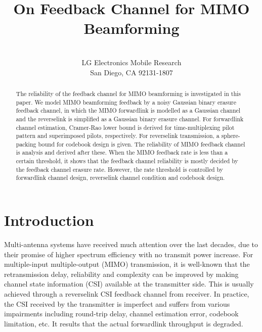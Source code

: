 \documentclass[10pt,fleqn, twocolumn]{IEEEtran}
\title{On Feedback Channel for MIMO Beamforming}
\author{\\LG Electronics Mobile Research\\San Diego, CA 92131-1807}
\date{}
\begin{document}
\maketitle
\begin{abstract}\small
The reliability of the feedback channel for MIMO beamforming is
investigated in this paper. We model MIMO beamforming feedback by
a noisy Gaussian binary erasure feedback channel, in which the
MIMO forwardlink is modelled as a Gaussian channel and the
reverselink is simplified as a Gaussian binary erasure channel.
For forwardlink channel estimation, Cramer-Rao lower bound is
derived for time-multiplexing pilot pattern and superimposed
pilots, respectively. For reverselink transmission, a
sphere-packing bound for codebook design is given. The reliability
of MIMO feedback channel is analysis and derived after these. When
the MIMO feedback rate is less than a certain threshold, it shows
that the feedback channel reliability is mostly decided by the
feedback channel erasure rate. However, the rate threshold is
controlled by forwardlink channel design, reverselink channel
condition and codebook design.

\end{abstract}
\section{Introduction}
Multi-antenna systems have received much attention over the last
decades, due to their promise of higher spectrum efficiency with
no transmit power increase. For multiple-input multiple-output
(MIMO) transmission, it is well-known that the retransmission
delay, reliability and complexity can be improved by making
channel state information (CSI) available at the transmitter side.
This is usually achieved through a reverselink CSI feedback
channel from receiver. In practice, the CSI received by the
transmitter is imperfect and suffers from various impairments
including round-trip delay, channel estimation error, codebook
limitation, etc. It results that the actual forwardlink throughput
is degraded.
\end{document}
